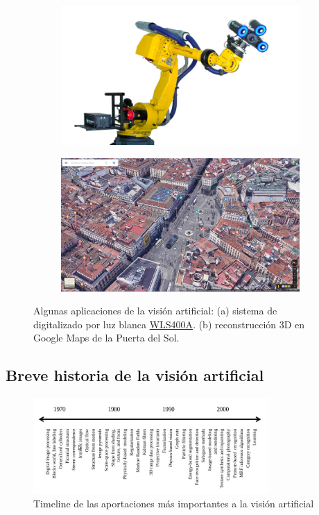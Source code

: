 \begin{figure}
\begin{subfigure}{.5\textwidth}
  \centering
  \includegraphics[width=.9\linewidth]{images/camera.jpg}
  \caption { }
  \label{fig:apps1a}
\end{subfigure}%
\begin{subfigure}{.5\textwidth}
  \centering
  \includegraphics[width=.9\linewidth]{images/maps.jpg}
  \caption { }
  \label{fig:apps1b}
\end{subfigure}
\caption{Algunas aplicaciones de la visión artificial: (a) sistema de digitalizado por luz blanca \href{http://www.hexagonmi.com/es-ES/products/white-light-scanner-systems/hexagon-metrology-wls400a}{WLS400A}. (b) reconstrucción 3D en Google Maps de la Puerta del Sol. }
\label{fig:applications}
\end{figure}

\subsection{Breve historia de la visión artificial}

\begin{figure}[H]
	\centering
	\includegraphics[width=0.8\textwidth]{images/timeline}
	\caption{Timeline de las aportaciones más importantes a la visión artificial \cite{book:szeliski}}
\end{figure}

